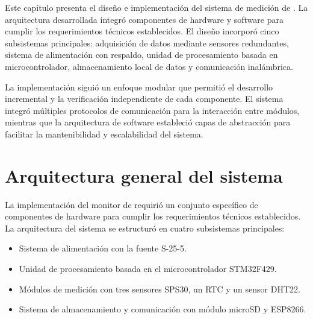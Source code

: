

Este capítulo presenta el diseño e implementación del sistema de medición de \MPF. La arquitectura desarrollada integró componentes de hardware y software para cumplir los requerimientos técnicos establecidos. El diseño incorporó cinco subsistemas principales: adquisición de datos mediante sensores redundantes, sistema de alimentación con respaldo, unidad de procesamiento basada en microcontrolador, almacenamiento local de datos y comunicación inalámbrica.

La implementación siguió un enfoque modular que permitió el desarrollo incremental y la verificación independiente de cada componente. El sistema integró múltiples protocolos de comunicación para la interacción entre módulos, mientras que la arquitectura de software estableció capas de abstracción para facilitar la mantenibilidad y escalabilidad del sistema.





\section{Arquitectura general del sistema}

La implementación del monitor de \MPF requirió un conjunto específico de componentes de hardware para cumplir los requerimientos técnicos establecidos. La arquitectura del sistema se estructuró en cuatro subsistemas principales:
\begin{itemize}
	\item Sistema de alimentación con la fuente S-25-5.
	\item Unidad de procesamiento basada en el microcontrolador STM32F429.
	\item Módulos de medición con tres sensores SPS30, un RTC y un sensor DHT22.
	\item Sistema de almacenamiento y comunicación con módulo microSD y ESP8266.
\end{itemize}

